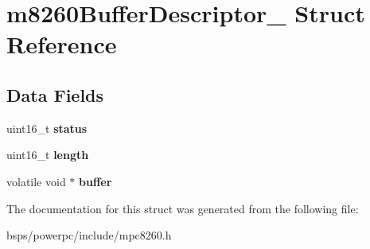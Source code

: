 \hypertarget{structm8260BufferDescriptor__}{}\section{m8260\+Buffer\+Descriptor\+\_\+ Struct Reference}
\label{structm8260BufferDescriptor__}
\subsection*{Data Fields}
\begin{DoxyCompactItemize}
\item 
\mbox{\label{structm8260BufferDescriptor___a4c8516156a54e4788c5c48bd759714d4}} 
uint16\+\_\+t {\bfseries status}
\item 
\mbox{\label{structm8260BufferDescriptor___a12b86199132191a24b0b2f6929ec1ec7}} 
uint16\+\_\+t {\bfseries length}
\item 
\mbox{\label{structm8260BufferDescriptor___ab76075cd6960bc2007df2b55d44a3c34}} 
volatile void $\ast$ {\bfseries buffer}
\end{DoxyCompactItemize}


The documentation for this struct was generated from the following file\+:\begin{DoxyCompactItemize}
\item 
bsps/powerpc/include/mpc8260.\+h\end{DoxyCompactItemize}
